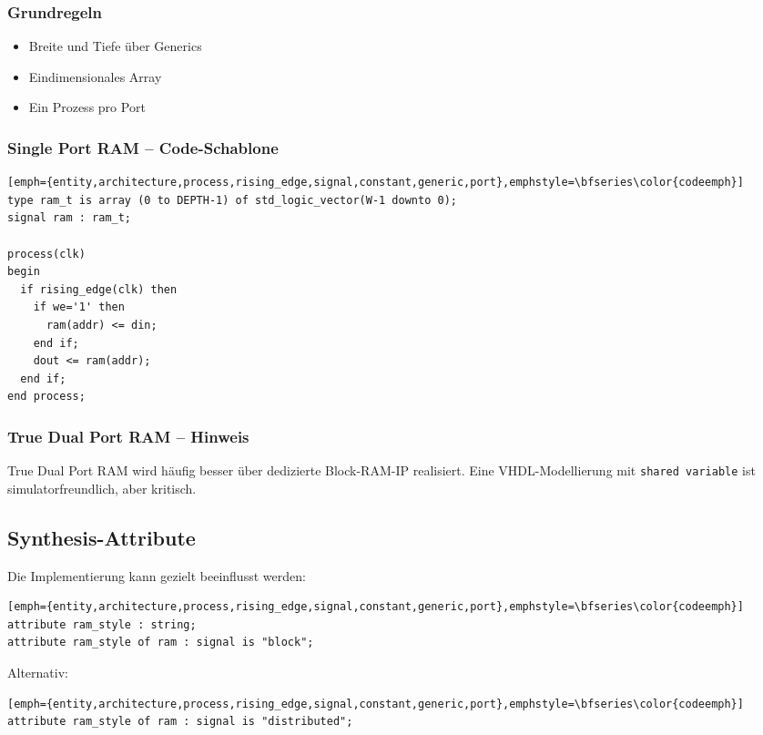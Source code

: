 \documentclass[10pt,a4paper]{article}
\begin{document}
\begin{multicols}{3}
\subsubsection*{Grundregeln}
\begin{itemize}
  \item Breite und Tiefe über Generics
  \item Eindimensionales Array
  \item Ein Prozess pro Port
\end{itemize}

\subsubsection*{Single Port RAM – Code-Schablone}
\begin{lstlisting}[emph={entity,architecture,process,rising_edge,signal,constant,generic,port},emphstyle=\bfseries\color{codeemph}][emph={entity,architecture,process,rising_edge,signal,constant,generic,port},emphstyle=\bfseries\color{codeemph}]
type ram_t is array (0 to DEPTH-1) of std_logic_vector(W-1 downto 0);
signal ram : ram_t;

process(clk)
begin
  if rising_edge(clk) then
    if we='1' then
      ram(addr) <= din;
    end if;
    dout <= ram(addr);
  end if;
end process;
\end{lstlisting}

\subsubsection*{True Dual Port RAM – Hinweis}
True Dual Port RAM wird häufig besser über dedizierte Block-RAM-IP realisiert.  
Eine VHDL-Modellierung mit \texttt{shared variable} ist simulatorfreundlich, aber kritisch.

\subsection{Synthesis-Attribute}
Die Implementierung kann gezielt beeinflusst werden:

\begin{lstlisting}[emph={entity,architecture,process,rising_edge,signal,constant,generic,port},emphstyle=\bfseries\color{codeemph}][emph={entity,architecture,process,rising_edge,signal,constant,generic,port},emphstyle=\bfseries\color{codeemph}]
attribute ram_style : string;
attribute ram_style of ram : signal is "block";
\end{lstlisting}

Alternativ:
\begin{lstlisting}[emph={entity,architecture,process,rising_edge,signal,constant,generic,port},emphstyle=\bfseries\color{codeemph}][emph={entity,architecture,process,rising_edge,signal,constant,generic,port},emphstyle=\bfseries\color{codeemph}]
attribute ram_style of ram : signal is "distributed";
\end{lstlisting}


\end{multicols}
\end{document}
